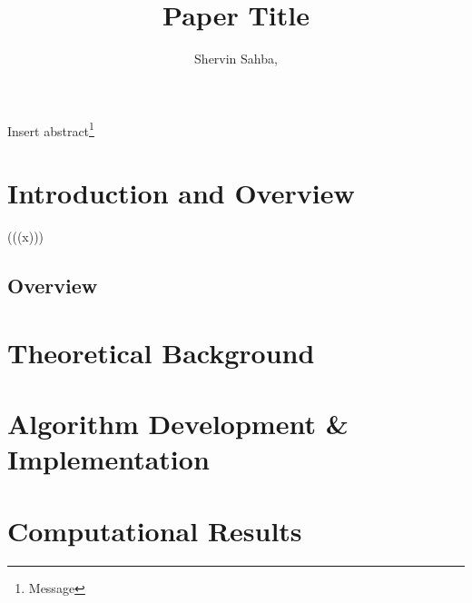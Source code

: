 \documentclass{shervin} %
\begin{document}
\title{Paper Title}

\author{Shervin Sahba,}
\address{Department of Physics, University of Washington, Seattle, WA 98105, USA.}



\begin{abstract*}
Insert abstract\footnote{Message}
\end{abstract*}


\section{Introduction and Overview}

\begin{boxed}{(((x)))}\end{boxed}


\subsection{Overview}

\medskip
\section{Theoretical Background} \label{sec:Background}

\medskip
\section{Algorithm Development \& Implementation} \label{sec:Methods}

\medskip{}
\section{Computational Results} \label{sec:Results}
\end{document}
